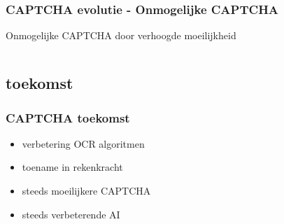 \documentclass{beamer}
\begin{document}
\begin{frame}
  \frametitle{CAPTCHA evolutie - Onmogelijke CAPTCHA}
  Onmogelijke CAPTCHA door verhoogde moeilijkheid
  \begin{columns}[c]
       \begin{center}
      \end{center}
     \begin{center}
      \end{center}
  \end{columns}
\end{frame}
\subsection{toekomst}
\begin{frame}
  \frametitle{CAPTCHA toekomst}
  \begin{itemize}
    \item<+-> verbetering OCR algoritmen
    \item<+-> toename in rekenkracht
  \end{itemize}
  \vfill  
  \begin{itemize}
    \item<+-> steeds moeilijkere CAPTCHA
    \item<+-> steeds verbeterende AI
  \end{itemize}
\end{frame}
\end{document}
